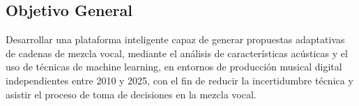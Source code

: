 \subsection{Objetivo General}
Desarrollar una plataforma inteligente capaz de generar propuestas adaptativas de cadenas de mezcla vocal, mediante el análisis de características acústicas y el uso de técnicas de machine learning, en entornos de producción musical digital independientes entre 2010 y 2025, con el fin de reducir la incertidumbre técnica y asistir el proceso de toma de decisiones en la mezcla vocal.